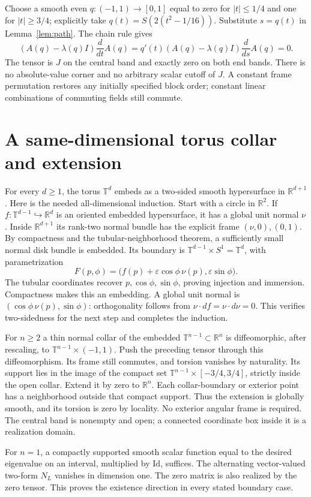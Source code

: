 \documentclass[11pt]{article}
\newcommand{\R}{\mathbb R}
\newcommand{\T}{\mathbb T}
\newcommand{\Id}{\mathrm{Id}}
\begin{document}
Choose a smooth even $q:(-1,1)\to[0,1]$ equal to zero for $|t|\leq1/4$
and one for $|t|\geq3/4$; explicitly take
$q(t)=S(2(t^2-1/16))$. Substitute $s=q(t)$ in Lemma~\ref{lem:path}.
The chain rule gives
\[
 (A(q)-\lambda(q)I)\frac{d}{dt}A(q)
 =q'(t)(A(q)-\lambda(q)I)\frac{d}{ds}A(q)=0.
\]
The tensor is $J$ on the central band and exactly zero on both end bands.
There is no absolute-value corner and no arbitrary scalar cutoff of $J$.
A constant frame permutation restores any initially specified block order;
constant linear combinations of commuting fields still commute.

\section{A same-dimensional torus collar and extension}
For every $d\geq1$, the torus $\T^d$ embeds as a two-sided smooth
hypersurface in $\R^{d+1}$. Here is the needed all-dimensional induction.
Start with a circle in $\R^2$. If $f:\T^{d-1}\hookrightarrow\R^d$ is an
oriented embedded hypersurface, it has a global unit normal $\nu$.
Inside $\R^{d+1}$ its rank-two normal bundle has the explicit frame
$(\nu,0),(0,1)$. By compactness and the tubular-neighborhood theorem, a
sufficiently small normal disk bundle is embedded. Its boundary is
$\T^{d-1}\times S^1=\T^d$, with parametrization
\[
 F(p,\phi)=\big(f(p)+\varepsilon\cos\phi\,\nu(p),
                         \varepsilon\sin\phi\big).
\]
The tubular coordinates recover $p,\cos\phi,\sin\phi$, proving injection
and immersion. Compactness makes this an embedding. A global unit normal
is $(\cos\phi\,\nu(p),\sin\phi)$: orthogonality follows from
$\nu\cdot df=\nu\cdot d\nu=0$. This verifies two-sidedness for the next
step and completes the induction.

For $n\geq2$ a thin normal collar of the embedded $\T^{n-1}\subset\R^n$
is diffeomorphic, after rescaling, to $\T^{n-1}\times(-1,1)$. Push the
preceding tensor through this diffeomorphism. Its frame still commutes,
and torsion vanishes by naturality. Its support lies in the image of the
compact set $\T^{n-1}\times[-3/4,3/4]$, strictly inside the open collar.
Extend it by zero to $\R^n$. Each collar-boundary or exterior point has
a neighborhood outside that compact support. Thus the extension is
globally smooth, and its torsion is zero by locality. No exterior angular
frame is required. The central band is nonempty and open; a connected
coordinate box inside it is a realization domain.

For $n=1$, a compactly supported smooth scalar function equal to the desired
eigenvalue on an interval, multiplied by $\Id$, suffices. The alternating
vector-valued two-form $N_L$ vanishes in dimension one. The zero matrix is
also realized by the zero tensor. This proves the existence direction in
every stated boundary case.
\end{document}

